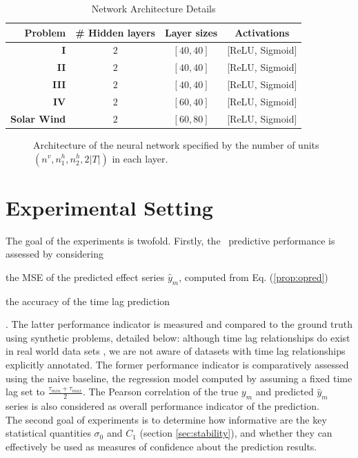 \begin{table}[htbp]
  \caption{Network Architecture Details}\label{tab:arch_probs}
  \centering
  \begin{tabular}{ r c c c }
  \hline
  Problem &  \# Hidden layers & Layer sizes & Activations\\
  \hline
  \textbf{I} & $2$ & $[40, 40]$  & [ReLU, Sigmoid]\\
  \textbf{II} & $2$ & $[40, 40]$ & [ReLU, Sigmoid]\\
  \textbf{III} & $2$ & $[40, 40]$ & [ReLU, Sigmoid]\\
  \textbf{IV} & $2$ & $[60, 40]$ & [ReLU, Sigmoid]\\
  \textbf{Solar Wind} & $2$ & $[60, 80]$ & [ReLU, Sigmoid]\\
  \hline
  \end{tabular}
\end{table}


\begin{figure}[ht]
\centerline{\resizebox*{0.7\textwidth}{!}{}}
\caption{\label{fig:archi} Architecture of the neural network specified by the number of units 
$(n^v,n_1^h,n_2^h,2\vert T\vert)$ in each layer.}
\label{fig:NN}
\end{figure}

\section{Experimental Setting}\label{sec:pdtExp}

The goal of the experiments is twofold. Firstly, the \XX\ predictive performance is assessed by considering 
\begin{enumerate*} \item the MSE of the predicted effect series $\hat y_m$, computed from Eq. (\ref{prop:opred})  
\item the accuracy of the time lag prediction \end{enumerate*}. The latter performance indicator is measured and 
compared to the ground truth using synthetic problems, detailed below: although time lag relationships do exist in 
real world data sets \citep{doi:10.1002/jgra.50429,ZHOU2006195}, we are not aware of datasets with time lag 
relationships explicitly annotated. The former performance indicator is comparatively assessed using the naive 
baseline, the regression model computed by assuming a fixed time lag set to $\frac{\tau_{min}+\tau_{max}}{2}$. 
The Pearson correlation of the true $y_m$ and predicted $\hat y_m$ series is also considered as overall 
performance indicator of the prediction.\\
The second goal of experiments is to determine how informative are the key statistical quantities 
$\sigma_0$ and $C_1$ (section \ref{sec:stability}), and whether they can effectively be used as measures 
of confidence about the prediction results. 

